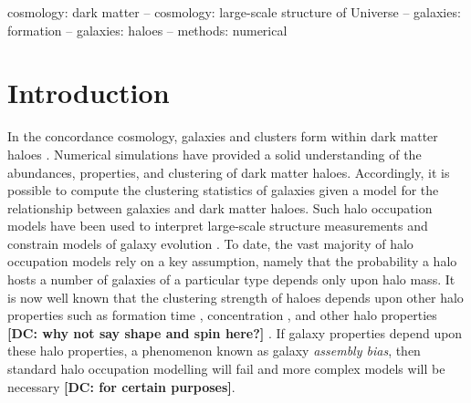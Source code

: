 \documentclass[usenatbib,fleqn]{mnras}
\begin{document}
\begin{keywords}
cosmology: dark matter -- cosmology: large-scale structure of Universe -- galaxies: formation -- galaxies: haloes -- methods: numerical
\end{keywords}



\section{Introduction}
\label{section:introduction}

In the concordance cosmology, galaxies and clusters form within dark matter haloes \citep{white_rees78,blumenthal_etal84, mo_etal10}. Numerical simulations have provided a solid understanding of the abundances, properties, and clustering of dark matter haloes. Accordingly, it is possible to compute the clustering statistics of galaxies given a model for the relationship between galaxies and dark matter haloes. Such halo occupation models have been used to interpret large-scale structure measurements and constrain models of galaxy evolution \citep{yang_etal03,tinker_etal05,zehavi_etal05b,porciani_norberg06,vdbosch_etal07,zheng_etal07,conroy_wechsler09,yang_etal09b,zehavi_etal11,guo_etal11a,wake_etal11,yang_etal11a,yang_etal12,leauthaud_etal12,rodriguezpuebla_etal12, behroozi_etal13b, moster_etal13, tinker_etal13,cacciato_etal13,more_etal13,guo_etal14,zu_mandelbaum15b}. To date, the vast majority of halo occupation models rely on a key assumption, namely that the probability a halo hosts a number of galaxies of a particular type depends only upon halo mass. It is now well known that the clustering strength of haloes depends upon other halo properties such as formation time \citep{gao_etal05,harker_etal06,wechsler_etal06,gao_white07,croton_etal07,zentner07,dalal_etal08, li_etal08, lacerna_padilla11}, concentration \citep{wechsler_etal06,faltenbacher_white10}, and other halo properties {\bf [DC: why not say shape and spin here?]} \citep{bett_etal07, hahn_etal07a, hahn_etal07b, hahn_etal09, faltenbacher_white10, hester_tasitsiomi10, lacerna_padilla12, vandaalen_etal12, fisher_faltenbacher16, sunayama_etal16, chavesmontero_etal16}. If galaxy properties depend upon these halo properties, a phenomenon known as galaxy {\em assembly bias}, then standard halo occupation modelling will fail \citep{zentner_etal14} and more complex models \citep{gilmarin_etal11, hearin_etal16} will be necessary {\bf [DC: for certain purposes]}.
\end{document}
